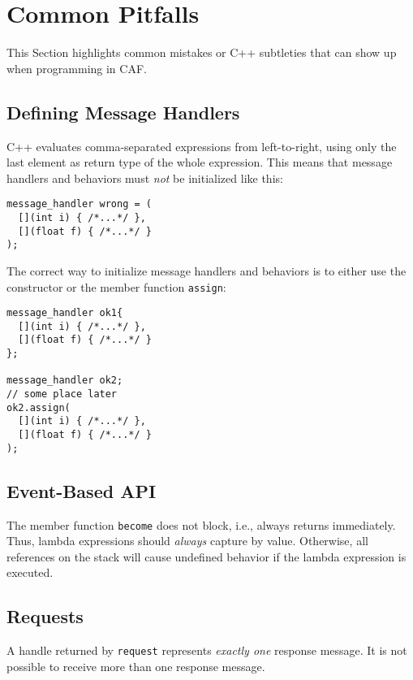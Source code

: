 \section{Common Pitfalls}
\label{pitfalls}

This Section highlights common mistakes or C++ subtleties that can show up when
programming in CAF.

\subsection{Defining Message Handlers}

C++ evaluates comma-separated expressions from left-to-right, using only the
last element as return type of the whole expression. This means that message
handlers and behaviors must \emph{not} be initialized like this:

\begin{lstlisting}
message_handler wrong = (
  [](int i) { /*...*/ },
  [](float f) { /*...*/ }
);
\end{lstlisting}

The correct way to initialize message handlers and behaviors is to either
use the constructor or the member function \lstinline^assign^:

\begin{lstlisting}
message_handler ok1{
  [](int i) { /*...*/ },
  [](float f) { /*...*/ }
};

message_handler ok2;
// some place later
ok2.assign(
  [](int i) { /*...*/ },
  [](float f) { /*...*/ }
);
\end{lstlisting}

\subsection{Event-Based API}

The member function \lstinline^become^ does not block, i.e., always returns
immediately. Thus, lambda expressions should \textit{always} capture by value.
Otherwise, all references on the stack will cause undefined behavior if the
lambda expression is executed.

\subsection{Requests}

A handle returned by \lstinline^request^ represents \emph{exactly one} response
message. It is not possible to receive more than one response message.

